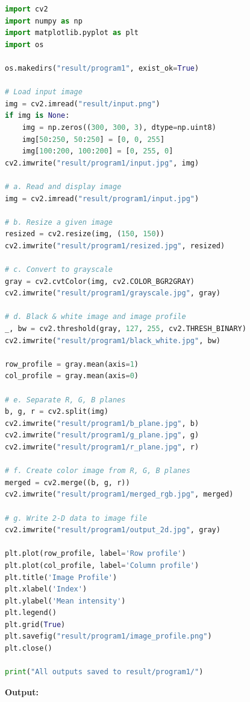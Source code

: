 \documentclass[12pt]{article}
\begin{document}
\begin{lstlisting}[language=Python]
import cv2
import numpy as np
import matplotlib.pyplot as plt
import os

os.makedirs("result/program1", exist_ok=True)

# Load input image
img = cv2.imread("result/input.png")
if img is None:
    img = np.zeros((300, 300, 3), dtype=np.uint8)
    img[50:250, 50:250] = [0, 0, 255]
    img[100:200, 100:200] = [0, 255, 0]
cv2.imwrite("result/program1/input.jpg", img)

# a. Read and display image
img = cv2.imread("result/program1/input.jpg")

# b. Resize a given image
resized = cv2.resize(img, (150, 150))
cv2.imwrite("result/program1/resized.jpg", resized)

# c. Convert to grayscale
gray = cv2.cvtColor(img, cv2.COLOR_BGR2GRAY)
cv2.imwrite("result/program1/grayscale.jpg", gray)

# d. Black & white image and image profile
_, bw = cv2.threshold(gray, 127, 255, cv2.THRESH_BINARY)
cv2.imwrite("result/program1/black_white.jpg", bw)

row_profile = gray.mean(axis=1)
col_profile = gray.mean(axis=0)

# e. Separate R, G, B planes
b, g, r = cv2.split(img)
cv2.imwrite("result/program1/b_plane.jpg", b)
cv2.imwrite("result/program1/g_plane.jpg", g)
cv2.imwrite("result/program1/r_plane.jpg", r)

# f. Create color image from R, G, B planes
merged = cv2.merge((b, g, r))
cv2.imwrite("result/program1/merged_rgb.jpg", merged)

# g. Write 2-D data to image file
cv2.imwrite("result/program1/output_2d.jpg", gray)

plt.plot(row_profile, label='Row profile')
plt.plot(col_profile, label='Column profile')
plt.title('Image Profile')
plt.xlabel('Index')
plt.ylabel('Mean intensity')
plt.legend()
plt.grid(True)
plt.savefig("result/program1/image_profile.png")
plt.close()

print("All outputs saved to result/program1/")
\end{lstlisting}

\vspace{8pt}
\textbf{\large Output:}
\end{document}
